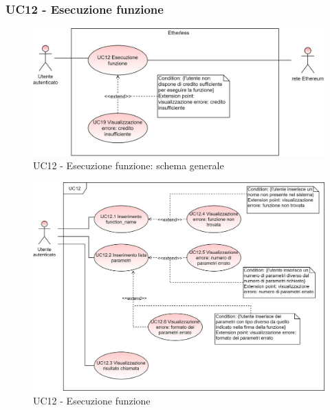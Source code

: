 \subsubsection{UC12 - Esecuzione funzione}
\begin{figure}[h]
	\centering
	\includegraphics[scale=\ucs]{./res/img/UC12G.png}
	\caption {UC12 - Esecuzione funzione: schema generale}
\end{figure}
\begin{figure}[h]
	\centering
	\includegraphics[scale=\ucs]{./res/img/UC12.png}
	\caption {UC12 - Esecuzione funzione}
\end{figure}
